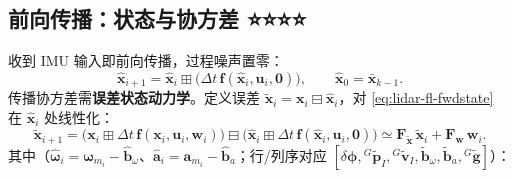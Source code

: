 \subsection{前向传播：状态与协方差 ⭐⭐⭐⭐}
\label{sec:lidar-fl-fwd}

收到 IMU 输入即前向传播，过程噪声置零\cite{xu2021fastlio}：
\begin{equation}
  \hat{\mathbf{x}}_{i+1}=\hat{\mathbf{x}}_i\boxplus\big(\Delta t\,\mathbf{f}(\hat{\mathbf{x}}_i,\mathbf{u}_i,\mathbf{0})\big),\qquad \hat{\mathbf{x}}_0=\bar{\mathbf{x}}_{k-1}.
  \label{eq:lidar-fl-fwdstate}
\end{equation}
传播协方差需\textbf{误差状态动力学}。定义误差 $\tilde{\mathbf{x}}_i=\mathbf{x}_i\boxminus\hat{\mathbf{x}}_i$，对 \cref{eq:lidar-fl-fwdstate} 在 $\hat{\mathbf{x}}_i$ 处线性化：
\begin{equation}
  \tilde{\mathbf{x}}_{i+1}=\big(\mathbf{x}_i\boxplus\Delta t\,\mathbf{f}(\mathbf{x}_i,\mathbf{u}_i,\mathbf{w}_i)\big)\boxminus\big(\hat{\mathbf{x}}_i\boxplus\Delta t\,\mathbf{f}(\hat{\mathbf{x}}_i,\mathbf{u}_i,\mathbf{0})\big)\simeq\mathbf{F}_{\tilde{\mathbf{x}}}\,\tilde{\mathbf{x}}_i+\mathbf{F}_{\mathbf{w}}\,\mathbf{w}_i.
  \label{eq:lidar-fl-errdyn}
\end{equation}
其中（$\hat{\boldsymbol{\omega}}_i=\boldsymbol{\omega}_{m_i}-\hat{\mathbf{b}}_\omega$、$\hat{\mathbf{a}}_i=\mathbf{a}_{m_i}-\hat{\mathbf{b}}_a$；行/列序对应 $[\delta\boldsymbol{\phi},{}^G\tilde{\mathbf{p}}_I,{}^G\tilde{\mathbf{v}}_I,\tilde{\mathbf{b}}_\omega,\tilde{\mathbf{b}}_a,{}^G\tilde{\mathbf{g}}]$）：
